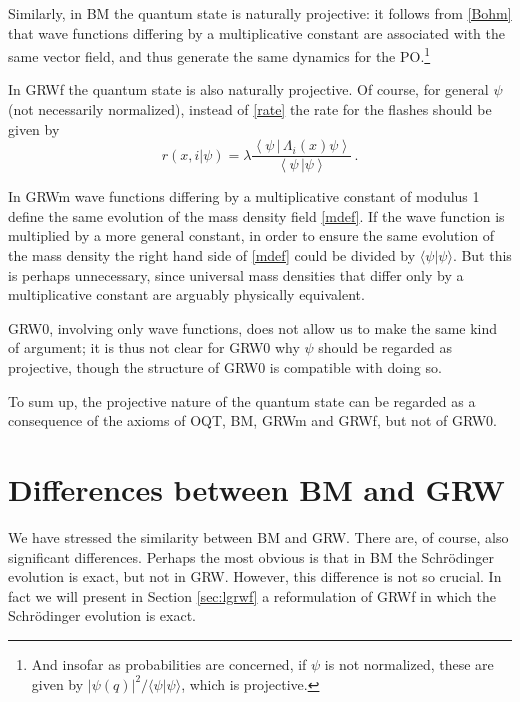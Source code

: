 \documentclass[12pt]{article}
\begin{document}
Similarly, in {\sf BM} the quantum state is naturally projective: it follows from \eqref{Bohm} that wave functions differing by a
   multiplicative constant are associated with the same vector field, and thus generate the same dynamics for the PO.\footnote{And insofar as probabilities are concerned, if $\psi$ is not normalized, these are given by $|\psi(q)|^2/\langle\psi|\psi\rangle$, which is projective.} 
 
In {\sf GRWf} the quantum state is also naturally projective. Of course, for general $\psi$ (not necessarily normalized), instead of  \eqref{rate} the rate for the flashes should be given by
   \begin{equation}\label{raten}
r(x,i|\psi)=\lambda \frac{\left\langle\psi\,|\,\Lambda_{i}(x)\psi\right\rangle}{ \left\langle\psi\,|\psi\right\rangle}\,.
\end{equation}

In {\sf GRWm} wave functions differing by a multiplicative constant of modulus 1 define the same evolution of the mass density field  \eqref{mdef}. If the wave function is multiplied by a more general constant,  in order to ensure the same evolution of the mass density
the right hand side of \eqref{mdef} could be divided by $\langle\psi|\psi\rangle$. But this is perhaps unnecessary, since universal mass densities that differ only by a multiplicative constant are arguably physically equivalent.

{\sf GRW0}, involving only wave functions, does not allow us to make the 
same kind of argument; it is thus not clear for {\sf GRW0} why $\psi$ should be regarded 
as projective, though the structure of {\sf GRW0} is compatible with doing 
so.

 
To sum up, the projective nature of the quantum state can be regarded as a consequence of the axioms of {\sf OQT}, {\sf BM}, {\sf GRWm} and {\sf GRWf}, but not of {\sf GRW0}.


\section{Differences between BM and GRW}
\label{sec:diff}

We have stressed the similarity between {\sf BM} and {\sf GRW}.  There are, of course, also significant differences. Perhaps the most obvious is that in {\sf BM} the Schr\"odin\-ger evolution is exact, but not in {\sf GRW}. However, this difference is not so crucial. In fact we will present in Section \ref{sec:lgrwf} a reformulation of {\sf GRWf} in which the Schr\"odin\-ger evolution is exact.
\end{document}
